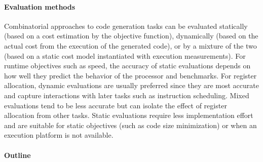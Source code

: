 \documentclass[acmsmall,authorversion,nonacm]{acmart}
\begin{document}
\paragraph{Evaluation methods}

Combinatorial approaches to code generation tasks can be evaluated
statically (based on a cost estimation by the objective function),
dynamically (based on the actual cost from the execution of the
generated code), or by a mixture of the two (based on a static cost
model instantiated with execution measurements).
For runtime objectives such as speed, the accuracy of static
evaluations depends on how well they predict the behavior of the
processor and benchmarks.
For register allocation, dynamic evaluations are usually preferred
since they are most accurate and capture interactions with later tasks
such as instruction scheduling.
Mixed evaluations tend to be less accurate but can isolate the effect
of register allocation from other tasks.
Static evaluations require less implementation effort and are suitable
for static objectives (such as code size minimization) or when an
execution platform is not available.

\paragraph{Outline}
\end{document}
